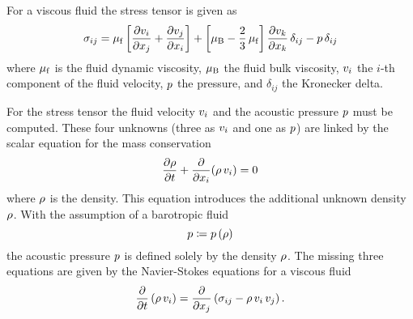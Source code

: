 For a viscous fluid the stress tensor is given as
\begin{equation}
  \sigma_{ij} = \mu_{\mathrm{f}}\left[ \pdv{v_{i}}{x_{j}} + \pdv{v_{j}}{x_{i}} \right] + 
  \left[ \mu_{\mathrm{B}} - \frac{2}{3}\,\mu_{\mathrm{f}} \right] \pdv{v_{k}}{x_{k}} 
  \,\delta_{ij} - p\,\delta_{ij}
  \label{eq:TA-stress}
\end{equation}
where $\mu_{\mathrm{f}}$ is the fluid dynamic viscosity, $\mu_{\mathrm{B}}$ the fluid bulk 
viscosity, $v_{i}$ the $i$-th component of the fluid velocity, $p$ the 
pressure, and $\delta_{ij}$ the Kronecker delta.

For the stress tensor the fluid velocity $v_{i}$ and the acoustic pressure 
$p$ must be computed. These four unknowns (three as $v_{i}$ and one as 
$p$) are linked by the scalar equation for the mass conservation
\begin{equation}
  \pdv{\rho}{t} + \pdv{x_{i}}(\rho\,v_{i}) = 0
  \label{eq:TA-massconservation}
\end{equation}
where $\rho$ is the density. This equation introduces the additional 
unknown density $\rho$. With the assumption of a barotropic fluid
\begin{equation}
  p \coloneqq p\left( \rho \right)
  \label{eq:TA-state}
\end{equation}
the acoustic pressure $p$ is defined solely by the density $\rho$. The 
missing three equations are given by the Navier-Stokes equations for a viscous 
fluid
\begin{equation}
  \pdv{t}\left( \rho\,v_{i} \right) = \pdv{x_{j}} \left( \sigma_{ij} - 
  \rho\,v_{i}\,v_{j} \right).
    \label{eq:TA-navierconservative}
\end{equation}


